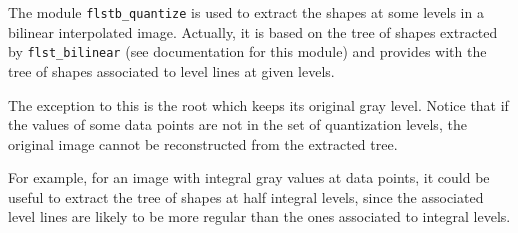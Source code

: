 The module \texttt{flstb\_quantize} is used to extract the shapes at some levels
in a bilinear interpolated image. 
Actually, it is based on the tree of shapes
extracted by \texttt{flst\_bilinear} (see documentation for this module) and
provides with the tree of shapes associated to level lines at given levels.

The exception to this is the root which keeps its original gray level.
Notice that if the values of some data points are not in the set of
quantization levels, the original image cannot be reconstructed from the
extracted tree.

For example, for an image with integral gray values at data points, it could
be useful to extract the tree of shapes at half integral levels, since the
associated level lines are likely to be more regular than the ones associated
to integral levels.
